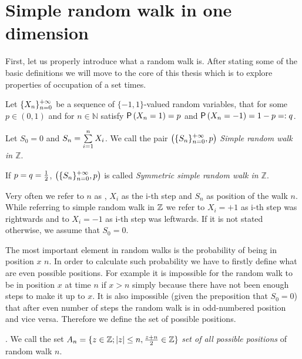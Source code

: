 \chapter{Simple random walk in one dimension}

\begin{rem}
  First, let us properly introduce what a random walk is. After stating some of the basic definitions we will move to the core of this thesis which is to explore properties of occupation of a set times.
\end{rem}

\begin{defn}\label{defn-simple_random_walk_Z}
 Let $\{X_n\}_{n=0}^{+\infty}$ be a sequence of  \iid $\{-1,1\}$-valued random variables, that for some $p\in(0,1)$ and for $n\in \mathbb{N}$ satisfy $\operatorname{\mathsf{P}} \left( X_n=1 \right) =p$ and $\operatorname{\mathsf{P}} \left( X_n=-1 \right) =1-p=:q$.

 Let $S_0=0$ and $S_n=\suma[i][1][n]X_i$. We call the pair $ \left( \{S_n\}_{n=0}^{+\infty}, p \right) $ \emph{Simple random walk in $\mathbb{Z}$}.

 If $p=q=\frac{1}{2} $, $ \left( \{S_n\}_{n=0}^{+\infty}, p \right) $ is called
\emph{Symmetric simple random walk in $\mathbb{Z}$}.
\end{defn}

\begin{rem}
 Very often we refer to $n$ as \Time, $X_i$ as the i-th step and $S_n$ as position of the walk \intime $n$.
 While referring to simple random walk in $\mathbb{Z}$ we refer to $X_i=+1$ as i-th step was rightwards and to $X_i=-1$ as i-th step was leftwards. If it is not stated otherwise, we assume that $S_0=0.$
\end{rem}

\begin{rem}
  The most important element in random walks is the probability of being in position $x$ \intime $n$.
  In order to calculate such probability we have to firstly define what are even possible positions. For example it is impossible for the random walk to be in position $x$ at time $n$ if $x>n$ simply because there have not been enough steps to make it up to $x$. It is also impossible (given the preposition that $S_0=0$) that after even number of steps the random walk is in odd-numbered position and vice versa. Therefore we define the set of possible positions.
\end{rem}

\begin{defn}\label{defn-set_all_possible_values}
 \Lrw. We call the set $A_n=\{z \in \mathbb{Z}; \left|{z}\right|\leq n, \frac{z+n}{2}\in \mathbb{Z} \}$ \emph{set of all possible positions} of random walk \rw \intime $n$.
\end{defn}


